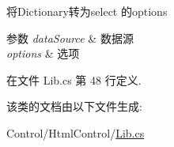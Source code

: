 将\-Dictionary转为select 的options 


\begin{DoxyParams}{参数}
{\em data\-Source} & 数据源\\
\hline
{\em options} & 选项\\
\hline
\end{DoxyParams}


在文件 Lib.\-cs 第 48 行定义.



该类的文档由以下文件生成\-:\begin{DoxyCompactItemize}
\item 
Control/\-Html\-Control/\hyperlink{_control_2_html_control_2_lib_8cs}{Lib.\-cs}\end{DoxyCompactItemize}
